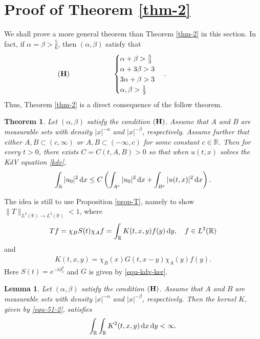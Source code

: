 \documentclass[preprint,12pt]{elsarticle}
\def\R {\mathbb{R}}
\def\d{{\,\rm d}}
\newtheorem{theorem}{Theorem}[section]
\newtheorem{lemma}{Lemma}[section]
\begin{document}
\section{Proof of Theorem \ref{thm-2}}

We shall prove a more general theorem than Theorem \ref{thm-2} in this section. In fact, if $\alpha=\beta>\frac{5}{6}$, then $(\alpha,\beta)$ satisfy that
$$
  ({\bf H}) \qquad   \qquad \qquad   \begin{cases}
          \alpha+\beta>\frac{5}{3}&\\
          \alpha+3\beta>3&\\
          3\alpha+\beta>3&\\
          \alpha,\beta>\frac{1}{2}&
       \end{cases}.
        \qquad \qquad \qquad
$$
Thus, Theorem \ref{thm-2} is a direct consequence of the follow theorem.

\begin{theorem}\label{thm-4}
Let $(\alpha,\beta)$ satisfy the condition $({\bf H})$. Assume that  $A$ and $B$ are measurable sets with density  $|x|^{-\alpha}$ and $|x|^{-\beta}$, respectively. Assume further that either  $A,B\subset (c,\infty)$ or $A,B\subset (-\infty,c)$  for some constant $c\in \R$. Then for every $t>0$, there exists $C=C(t,A,B)>0$ so that when $u(t,x)$  solves the KdV equation \eqref{kdv},
$$
    \int_\R |u_0|^2\d x \leq C\left( \int_{A^c}|u_0|^2\d x + \int_{B^c}|u(t,x)|^2\d x \right).
$$
\end{theorem}

The idea is still to use Proposition \ref{prop-T}, namely to show $\|T\|_{L^2(\R)\to L^2(\R)}<1$, where
\begin{align}\label{equ-51-1}
Tf=\chi_BS(t)\chi_A f = \int_\R K(t,x,y)f(y)\d y, \quad f\in L^2(\R)
\end{align}
and
\begin{align}\label{equ-51-2}
K(t,x,y)=\chi_B(x)G(t,x-y)\chi_A(y)f(y).
\end{align}
Here $S(t)=e^{-t\partial_x^3}$ and $G$ is given by \eqref{equ-kdv-ker}.


\begin{lemma}\label{lem-comp-2}
Let $(\alpha,\beta)$ satisfy the condition $({\bf H})$. Assume that  $A$ and $B$ are measurable sets with density $|x|^{-\alpha}$ and $|x|^{-\beta}$, respectively. Then the kernel $K$, given by \eqref{equ-51-2}, satisfies
    $$
       \int_{\mathbb{R}}\int_{\mathbb{R}}K^2(t,x,y)\d x\d y<\infty.
    $$
 \end{lemma}
\end{document}
